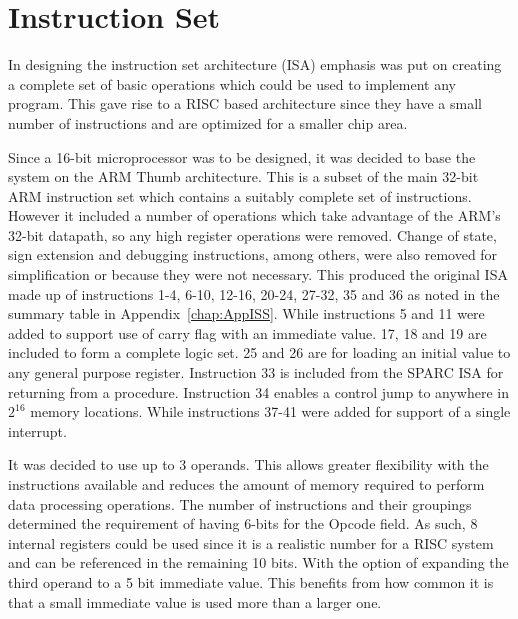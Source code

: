 
\chapter{Instruction Set}

In designing the instruction set architecture (ISA) emphasis was put on creating a complete set of basic operations which could be used to implement any program. This gave rise to a RISC based architecture since they have a small number of instructions and are optimized for a smaller chip area.

Since a 16-bit microprocessor was to be designed, it was decided to base the system on the ARM Thumb architecture. This is a subset of the main 32-bit ARM instruction set which contains a suitably complete set of instructions. However it included a number of operations which take advantage of the ARM's 32-bit datapath, so any high register operations were removed. Change of state, sign extension and debugging instructions, among others, were also removed for simplification or because they were not necessary. This produced the original ISA made up of instructions 1-4, 6-10, 12-16, 20-24, 27-32, 35 and 36 as noted in the summary table in Appendix~\ref{chap:AppISS}. While instructions 5 and 11 were added to support use of carry flag with an immediate value. 17, 18 and 19 are included to form a complete logic set. 25 and 26 are for loading an initial value to any general purpose register. Instruction 33 is included from the SPARC ISA for returning from a procedure. Instruction 34 enables a control jump to anywhere in $2^{16}$ memory locations. While instructions 37-41 were added for support of a single interrupt.

It was decided to use up to 3 operands. This allows greater flexibility with the instructions available and reduces the amount of memory required to perform data processing operations. The number of instructions and their groupings determined the requirement of having 6-bits for the Opcode field. As such, 8 internal registers could be used since it is a realistic number for a RISC system and can be referenced in the remaining 10 bits. With the option of expanding the third operand to a 5 bit immediate value. This benefits from how common it is that a small immediate value is used more than a larger one. 

